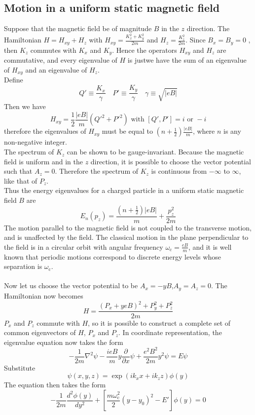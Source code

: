 \subsection{Motion in a uniform static magnetic field} 
Suppose that the magnetic field be of magnitude $B$ in the $z$ direction. The Hamiltonian $H = H_{xy}+H_z$ with $H_{xy} = \frac{K_x^2+K_y^2}{2m}$ and $H_z = \frac{K_z^2}{2m}$. 
Since $B_x = B_y = 0$ , then $K_z$ commutes with $K_x$ and $K_y$. Hence the operators $H_{xy}$ and $H_z$ are commutative, and every eigenvalue of $H$ is justwe have
the sum of an eigenvalue of $H_{xy}$ and an eigenvalue of $H_z$. 
\\
Define
\[Q' \equiv \frac{K_x}{\gamma} \quad P' \equiv \frac{K_y}{\gamma} \quad \gamma \equiv \sqrt{|eB|} \]
Then we have
\[H_{xy} = \frac{1}{2} \frac{|eB|}{m}(Q'^2+P'^2) \mbox{  with  } [Q',P'] = i \mbox{  or  }-i\]
therefore the eigenvalues of $H_{xy}$ must be equal to $(n+\frac{1}{2})\frac{|eB|}{m}$, where $n$ is any non-negative integer.\\
The spectrum of $K_z$ can be shown to be gauge-invariant.
Because the magnetic field is uniform and in the $z$ direction, it is possible to choose the vector potential such that $A_z = 0$. Therefore the spectrum of $K_z$ is
continuous from $-\infty$ to $\infty$, like that of $P_z$.\\
Thus the energy eigenvalues for a charged particle in a uniform static magnetic field $B$ are
\[E_n(p_z) = \frac{(n+\frac{1}{2})|eB|}{m} + \frac{p_z^2}{2m}\]
The motion parallel to the magnetic field is not coupled to the transverse motion, and is unaffected by the field. The classical motion in the plane perpendicular to the field is
in a circular orbit with angular frequency $\omega_{\mathrm{c}} = \frac{eB}{m}$, and it is well known that periodic motions correspond to discrete energy levels whose separation is $\omega_{\mathrm{c}}$.\\ \\
Now let us choose the vector potential to be $A_x=-yB$,$A_y=A_z=0$. The Hamiltonian now becomes
\[H = \frac{(P_x+yeB)^2 + P_y^2 + P_z^2}{2m}\]
$P_x$ and $P_z$ commute with $H$, so it is possible to construct a complete set of common eigenvectors of $H$, $P_x$ and $P_z$. In coordinate representation, the eigenvalue equation now takes the form
\[-\frac{1}{2m}\nabla^2 \psi - \frac{ieB}{m}y\frac{\partial}{\partial x}\psi + \frac{e^2B^2}{2m}y^2\psi = E\psi\]
Substitute
\[\psi(x,y,z) = \exp(ik_xx+ik_zz)\phi(y)\]
The equation then takes the form
\[-\frac{1}{2m} \frac{d^2\phi(y)}{dy^2} + \left[ \frac{m\omega_{\mathrm{c}}^2}{2}(y-y_0)^2-E' \right]\phi(y) = 0\]
